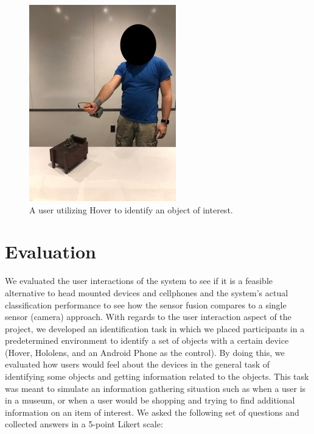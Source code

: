 \begin{figure}
\includegraphics{hoverinteraction}
\caption{A user utilizing Hover to identify an object of interest.}
\end{figure}
\section{Evaluation}

We evaluated the user interactions of the system to see if it is a feasible alternative to head mounted devices and cellphones and the system's actual classification performance to see how the sensor fusion compares to a single sensor (camera) approach.  With regards to the user interaction aspect of the project, we developed an identification task in which we placed participants in a predetermined environment to identify a set of objects with a certain device (Hover, Hololens, and an Android Phone as the control). By doing this, we evaluated how users would feel about the devices in the general task of identifying some objects and getting information related to the objects. This task was meant to simulate an information gathering situation such as when a user is in a museum, or when a user would be shopping and trying to find additional information on an item of interest.  We asked the following set of questions and collected answers in a 5-point Likert scale:  

